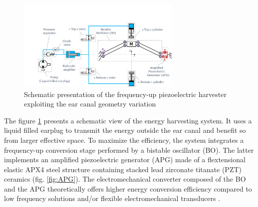\documentclass[3p,twocolumn,preprint]{elsarticle}
\begin{document}
\begin{figure}[!htbp]
	\centering
	\captionsetup{justification=centering}
	\includegraphics[trim={3.2cm 0cm 0cm 4.3cm},clip, width=0.7\textwidth]{figures/system_presentation.pdf}
	\caption{Schematic presentation of the frequency-up piezoelectric harvester exploiting the ear canal geometry variation} 
	\label{fig:system_presentation}
\end{figure}
The figure \ref{fig:system_presentation} presents a schematic view of the energy harvesting system. It uses a liquid filled earplug to transmit the energy outside the ear canal and benefit so from larger effective space. To maximize the efficiency, the system integrates a frequency-up conversion stage performed by a bistable oscillator (BO). The latter implements an amplified piezoelectric generator (APG) made of a flextensional elastic APX4 steel structure containing stacked lead zirconate titanate (PZT) ceramics (fig. \ref{fig:APG}). The electromechanical converter composed of the BO and the APG theoretically offers higher energy conversion efficiency compared to low frequency solutions and/or flexible electromechanical transducers \cite{Guo2019,Peng2021,Kulah2008}.
\end{document}
